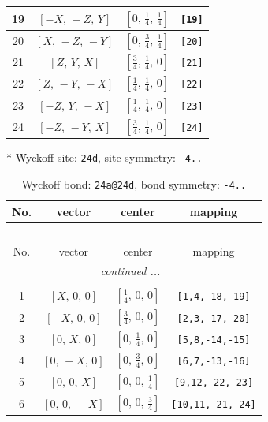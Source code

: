 \documentclass[fleqn,8pt]{jsarticle}
\begin{document}
\begin{longtable}{cccc}
19 & $\left[ - X,\, - Z,\, Y \right]$ & $\left[ 0,\, \frac{1}{4},\, \frac{1}{4} \right]$ & {\tt [19]} \\ \hline
20 & $\left[ X,\, - Z,\, - Y \right]$ & $\left[ 0,\, \frac{3}{4},\, \frac{1}{4} \right]$ & {\tt [20]} \\ \hline
21 & $\left[ Z,\, Y,\, X \right]$ & $\left[ \frac{3}{4},\, \frac{1}{4},\, 0 \right]$ & {\tt [21]} \\ \hline
22 & $\left[ Z,\, - Y,\, - X \right]$ & $\left[ \frac{1}{4},\, \frac{1}{4},\, 0 \right]$ & {\tt [22]} \\ \hline
23 & $\left[ - Z,\, Y,\, - X \right]$ & $\left[ \frac{1}{4},\, \frac{1}{4},\, 0 \right]$ & {\tt [23]} \\ \hline
24 & $\left[ - Z,\, - Y,\, X \right]$ & $\left[ \frac{3}{4},\, \frac{1}{4},\, 0 \right]$ & {\tt [24]} \\
\end{longtable}
* Wyckoff site: {\tt 24d}, site symmetry: {\tt -4..}
\renewcommand{\arraystretch}{1.2}
\begin{longtable}{cccc}
\caption{Wyckoff bond: {\tt 24a@24d}, bond symmetry: {\tt -4..}}
 \\
 \hline \hline
No. & vector & center & mapping \\ \hline \endfirsthead

\multicolumn{3}{l}{\tablename\ \thetable{}} \\
 \hline \hline
No. & vector & center & mapping \\ \hline \endhead

 \hline \hline
\multicolumn{3}{r}{\footnotesize\it continued ...} \\ \endfoot

 \hline \hline
\multicolumn{3}{r}{} \\ \endlastfoot

1 & $\left[ X,\, 0,\, 0 \right]$ & $\left[ \frac{1}{4},\, 0,\, 0 \right]$ & {\tt [1,4,-18,-19]} \\ \hline
2 & $\left[ - X,\, 0,\, 0 \right]$ & $\left[ \frac{3}{4},\, 0,\, 0 \right]$ & {\tt [2,3,-17,-20]} \\ \hline
3 & $\left[ 0,\, X,\, 0 \right]$ & $\left[ 0,\, \frac{1}{4},\, 0 \right]$ & {\tt [5,8,-14,-15]} \\ \hline
4 & $\left[ 0,\, - X,\, 0 \right]$ & $\left[ 0,\, \frac{3}{4},\, 0 \right]$ & {\tt [6,7,-13,-16]} \\ \hline
5 & $\left[ 0,\, 0,\, X \right]$ & $\left[ 0,\, 0,\, \frac{1}{4} \right]$ & {\tt [9,12,-22,-23]} \\ \hline
6 & $\left[ 0,\, 0,\, - X \right]$ & $\left[ 0,\, 0,\, \frac{3}{4} \right]$ & {\tt [10,11,-21,-24]} \\
\end{longtable}
\end{document}
